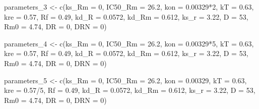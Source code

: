 \documentclass[
]{article}
\newenvironment{Shaded}{\begin{snugshade}}{\end{snugshade}}
\newcommand{\AttributeTok}[1]{\textcolor[rgb]{0.77,0.63,0.00}{#1}}
\newcommand{\DecValTok}[1]{\textcolor[rgb]{0.00,0.00,0.81}{#1}}
\newcommand{\FloatTok}[1]{\textcolor[rgb]{0.00,0.00,0.81}{#1}}
\newcommand{\FunctionTok}[1]{\textcolor[rgb]{0.00,0.00,0.00}{#1}}
\newcommand{\NormalTok}[1]{#1}
\newcommand{\OtherTok}[1]{\textcolor[rgb]{0.56,0.35,0.01}{#1}}
\newcommand{\SpecialCharTok}[1]{\textcolor[rgb]{0.00,0.00,0.00}{#1}}
\begin{document}
\begin{Shaded}
\begin{Highlighting}[]
\NormalTok{parameters\_3 }\OtherTok{\textless{}{-}} \FunctionTok{c}\NormalTok{(}\AttributeTok{ks\_Rm =} \DecValTok{0}\NormalTok{, }\AttributeTok{IC50\_Rm =} \FloatTok{26.2}\NormalTok{, }\AttributeTok{kon =} \FloatTok{0.00329}\SpecialCharTok{*}\DecValTok{2}\NormalTok{,}
                \AttributeTok{kT =} \FloatTok{0.63}\NormalTok{, }\AttributeTok{kre =} \FloatTok{0.57}\NormalTok{, }\AttributeTok{Rf =} \FloatTok{0.49}\NormalTok{, }\AttributeTok{kd\_R =} \FloatTok{0.0572}\NormalTok{,}
                \AttributeTok{kd\_Rm =} \FloatTok{0.612}\NormalTok{, }\AttributeTok{ks\_r =} \FloatTok{3.22}\NormalTok{, }\AttributeTok{D =} \DecValTok{53}\NormalTok{, }\AttributeTok{Rm0 =} \FloatTok{4.74}\NormalTok{,}
                \AttributeTok{DR =} \DecValTok{0}\NormalTok{, }\AttributeTok{DRN =} \DecValTok{0}\NormalTok{)}

\NormalTok{parameters\_4 }\OtherTok{\textless{}{-}} \FunctionTok{c}\NormalTok{(}\AttributeTok{ks\_Rm =} \DecValTok{0}\NormalTok{, }\AttributeTok{IC50\_Rm =} \FloatTok{26.2}\NormalTok{, }\AttributeTok{kon =} \FloatTok{0.00329}\SpecialCharTok{*}\DecValTok{5}\NormalTok{,}
                \AttributeTok{kT =} \FloatTok{0.63}\NormalTok{, }\AttributeTok{kre =} \FloatTok{0.57}\NormalTok{, }\AttributeTok{Rf =} \FloatTok{0.49}\NormalTok{, }\AttributeTok{kd\_R =} \FloatTok{0.0572}\NormalTok{,}
                \AttributeTok{kd\_Rm =} \FloatTok{0.612}\NormalTok{, }\AttributeTok{ks\_r =} \FloatTok{3.22}\NormalTok{, }\AttributeTok{D =} \DecValTok{53}\NormalTok{, }\AttributeTok{Rm0 =} \FloatTok{4.74}\NormalTok{,}
                \AttributeTok{DR =} \DecValTok{0}\NormalTok{, }\AttributeTok{DRN =} \DecValTok{0}\NormalTok{)}

\NormalTok{parameters\_5 }\OtherTok{\textless{}{-}} \FunctionTok{c}\NormalTok{(}\AttributeTok{ks\_Rm =} \DecValTok{0}\NormalTok{, }\AttributeTok{IC50\_Rm =} \FloatTok{26.2}\NormalTok{, }\AttributeTok{kon =} \FloatTok{0.00329}\NormalTok{,}
                \AttributeTok{kT =} \FloatTok{0.63}\NormalTok{, }\AttributeTok{kre =} \FloatTok{0.57}\SpecialCharTok{/}\DecValTok{5}\NormalTok{, }\AttributeTok{Rf =} \FloatTok{0.49}\NormalTok{, }\AttributeTok{kd\_R =} \FloatTok{0.0572}\NormalTok{,}
                \AttributeTok{kd\_Rm =} \FloatTok{0.612}\NormalTok{, }\AttributeTok{ks\_r =} \FloatTok{3.22}\NormalTok{, }\AttributeTok{D =} \DecValTok{53}\NormalTok{, }\AttributeTok{Rm0 =} \FloatTok{4.74}\NormalTok{,}
                \AttributeTok{DR =} \DecValTok{0}\NormalTok{, }\AttributeTok{DRN =} \DecValTok{0}\NormalTok{)}


\end{Highlighting}
\end{Shaded}
\end{document}
